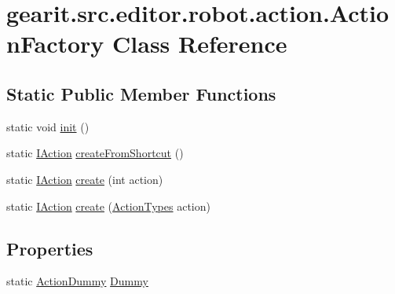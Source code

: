 \hypertarget{classgearit_1_1src_1_1editor_1_1robot_1_1action_1_1_action_factory}{\section{gearit.\+src.\+editor.\+robot.\+action.\+Action\+Factory Class Reference}
\label{classgearit_1_1src_1_1editor_1_1robot_1_1action_1_1_action_factory}
}
\subsection*{Static Public Member Functions}
\begin{DoxyCompactItemize}
\item 
static void \hyperlink{classgearit_1_1src_1_1editor_1_1robot_1_1action_1_1_action_factory_a73be8eacb6bbbb8a83d92469c2a61e6d}{init} ()
\item 
static \hyperlink{interfacegearit_1_1src_1_1editor_1_1robot_1_1action_1_1_i_action}{I\+Action} \hyperlink{classgearit_1_1src_1_1editor_1_1robot_1_1action_1_1_action_factory_afc53b0433176e3732ac7333427abf702}{create\+From\+Shortcut} ()
\item 
static \hyperlink{interfacegearit_1_1src_1_1editor_1_1robot_1_1action_1_1_i_action}{I\+Action} \hyperlink{classgearit_1_1src_1_1editor_1_1robot_1_1action_1_1_action_factory_a23ca961ad241269f5dd1399a94433cd8}{create} (int action)
\item 
static \hyperlink{interfacegearit_1_1src_1_1editor_1_1robot_1_1action_1_1_i_action}{I\+Action} \hyperlink{classgearit_1_1src_1_1editor_1_1robot_1_1action_1_1_action_factory_af707206c957862a177334f7535df3c34}{create} (\hyperlink{namespacegearit_1_1src_1_1editor_1_1robot_1_1action_a4be0fd46e3952d6135136b20e7b3fc5e}{Action\+Types} action)
\end{DoxyCompactItemize}
\subsection*{Properties}
\begin{DoxyCompactItemize}
\item 
static \hyperlink{classgearit_1_1src_1_1editor_1_1robot_1_1action_1_1_action_dummy}{Action\+Dummy} \hyperlink{classgearit_1_1src_1_1editor_1_1robot_1_1action_1_1_action_factory_a5905034c7cc5a1ee4494df679bcfc630}{Dummy}
\end{DoxyCompactItemize}


